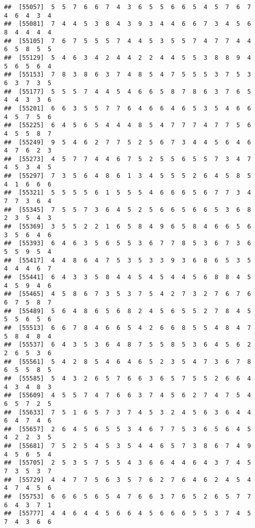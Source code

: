 \documentclass[
]{book}
\begin{document}
\begin{verbatim}
##  [55057]  5  5  7  6  6  7  4  3  6  5  5  6  6  5  4  5  7  6  7  4  6  4  3  4
##  [55081]  7  4  4  5  3  8  4  3  9  3  4  4  6  6  7  3  4  5  6  8  4  4  4  4
##  [55105]  7  6  7  5  5  5  7  4  4  5  3  5  5  7  4  7  7  4  4  6  5  8  5  5
##  [55129]  5  4  6  3  4  2  4  4  2  2  4  4  5  5  3  8  8  9  4  5  6  5  6  4
##  [55153]  7  8  3  8  6  3  7  4  8  5  4  7  5  5  5  3  7  5  3  6  3  7  3  5
##  [55177]  5  5  5  7  4  4  5  4  6  6  5  8  7  8  6  3  7  6  5  4  4  3  3  6
##  [55201]  6  6  3  5  5  7  7  6  4  6  6  4  6  5  3  5  4  6  6  4  5  7  5  6
##  [55225]  6  4  5  6  5  4  4  4  8  5  4  7  7  7  4  7  7  5  6  4  5  5  8  7
##  [55249]  9  5  4  6  2  7  7  5  2  5  6  7  3  4  4  5  6  4  6  4  7  6  2  3
##  [55273]  4  5  7  7  4  4  6  7  5  2  5  5  6  5  5  7  3  4  7  4  5  3  4  5
##  [55297]  7  3  5  6  4  8  6  1  3  4  5  5  5  2  6  4  5  8  5  4  1  6  6  6
##  [55321]  5  5  5  5  6  1  5  5  5  4  6  6  6  5  6  7  7  3  4  7  7  3  6  4
##  [55345]  7  5  5  7  3  6  4  5  2  5  6  6  5  6  6  5  3  6  8  2  3  5  4  3
##  [55369]  3  5  5  2  2  1  6  5  8  4  9  6  5  8  4  6  6  5  6  3  5  6  4  6
##  [55393]  6  4  6  3  5  6  5  5  3  6  7  7  8  5  3  6  7  3  6  5  5  9  5  4
##  [55417]  4  4  8  6  4  7  5  3  5  3  3  9  3  6  8  6  5  3  5  4  4  4  6  7
##  [55441]  6  4  3  3  5  8  4  4  5  4  5  4  4  5  6  8  8  4  5  4  5  9  4  6
##  [55465]  4  5  8  6  7  3  5  3  7  5  4  2  7  3  2  7  6  7  6  6  7  5  8  7
##  [55489]  5  6  4  8  6  5  6  8  2  4  5  6  5  5  2  7  8  4  5  5  5  6  5  6
##  [55513]  6  6  7  8  4  6  6  5  4  2  6  6  8  5  5  4  8  4  7  5  8  4  8  4
##  [55537]  6  4  3  5  3  6  4  8  7  5  5  8  5  3  6  4  5  6  2  2  6  5  3  6
##  [55561]  5  4  2  8  5  4  6  4  6  5  2  3  5  4  7  3  6  7  8  6  5  5  8  5
##  [55585]  5  4  3  2  6  5  7  6  6  3  6  5  7  5  5  2  6  6  4  4  3  4  8  3
##  [55609]  4  5  5  7  4  7  6  6  3  7  4  5  6  2  7  4  7  5  4  6  5  7  2  5
##  [55633]  7  5  1  6  5  7  3  7  4  5  3  2  4  5  6  3  6  4  4  6  4  7  4  6
##  [55657]  2  6  4  5  6  5  5  3  4  6  7  7  5  3  6  5  6  4  5  4  2  2  3  5
##  [55681]  7  5  2  5  4  5  3  5  4  4  6  5  7  3  8  6  7  4  9  4  5  6  5  4
##  [55705]  2  5  3  5  7  5  5  4  3  6  6  4  4  6  4  3  7  4  5  7  3  5  3  7
##  [55729]  4  4  7  7  5  6  3  5  7  6  2  7  6  4  6  2  4  5  4  4  7  4  5  6
##  [55753]  6  6  6  5  6  5  4  7  6  6  3  7  6  5  2  6  5  7  7  6  4  3  7  1
##  [55777]  4  4  6  4  4  5  6  6  4  5  6  6  6  5  5  3  7  4  5  7  4  3  6  6

\end{verbatim}
\end{document}
